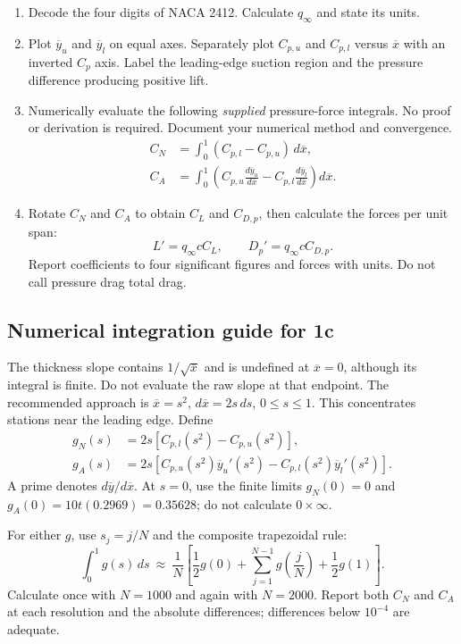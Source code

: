 \documentclass[11pt]{article}
\newcommand{\X}{\overline{x}}
\newcommand{\Yu}{\overline{y}_u}
\newcommand{\Yl}{\overline{y}_l}
\newcommand{\Cpu}{C_{p,u}}
\newcommand{\Cpl}{C_{p,l}}
\begin{document}
\begin{enumerate}[label=\textbf{1\alph*.}]
\item Decode the four digits of NACA 2412. Calculate $q_\infty$ and state its units.
\item Plot $\Yu$ and $\Yl$ on equal axes. Separately plot $\Cpu$ and $\Cpl$ versus $\X$ with an inverted $C_p$ axis. Label the leading-edge suction region and the pressure difference producing positive lift.
\item Numerically evaluate the following \emph{supplied} pressure-force integrals. No proof or derivation is required. Document your numerical method and convergence.
\begin{align}
C_N &= \int_0^1(\Cpl-\Cpu)\,d\X,\\
C_A &= \int_0^1\left(\Cpu\frac{d\Yu}{d\X}-\Cpl\frac{d\Yl}{d\X}\right)d\X.
\end{align}
\item Rotate $C_N$ and $C_A$ to obtain $C_L$ and $C_{D,p}$, then calculate the forces per unit span:
\[
L'=q_\infty c C_L,\qquad D_p'=q_\infty c C_{D,p}.
\]
Report coefficients to four significant figures and forces with units. Do not call pressure drag total drag.
\end{enumerate}

\subsection*{Numerical integration guide for 1c}
The thickness slope contains $1/\sqrt{\X}$ and is undefined at $\X=0$, although its integral is finite. Do not evaluate the raw slope at that endpoint. The recommended approach is $\X=s^2$, $d\X=2s\,ds$, $0\le s\le1$. This concentrates stations near the leading edge. Define
\begin{align}
g_N(s)&=2s\left[\Cpl(s^2)-\Cpu(s^2)\right],\\
g_A(s)&=2s\left[\Cpu(s^2)\Yu'(s^2)-\Cpl(s^2)\Yl'(s^2)\right].
\end{align}
A prime denotes $d\overline y/d\X$. At $s=0$, use the finite limits $g_N(0)=0$ and $g_A(0)=10t(0.2969)=0.35628$; do not calculate $0\times\infty$.

For either $g$, use $s_j=j/N$ and the composite trapezoidal rule:
\[
\int_0^1g(s)\,ds\ \approx\ \frac1N\left[\frac12g(0)+
\sum_{j=1}^{N-1}g\!\left(\frac jN\right)+\frac12g(1)\right].
\]
Calculate once with $N=1000$ and again with $N=2000$. Report both $C_N$ and $C_A$ at each resolution and the absolute differences; differences below $10^{-4}$ are adequate.
\end{document}
